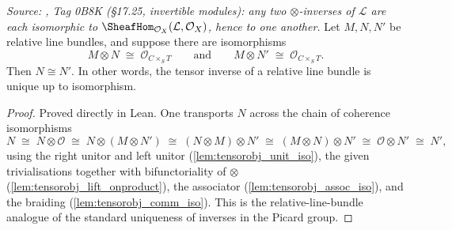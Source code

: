 \begin{lemma}\leanok
  \label{lem:rel_pic_sharp_inverse_unique}
  \textit{Source: \cite{stacks-project}, Tag 0B8K (\S 17.25, invertible modules): any
  two \(\otimes\)-inverses of \(\mathcal{L}\) are each isomorphic to
  \(\SheafHom_{\mathcal{O}_X}(\mathcal{L}, \mathcal{O}_X)\), hence to one
  another.}
  Let \(M, N, N'\) be relative line bundles, and suppose there are
  isomorphisms
  \[
    M \otimes N \;\cong\; \mathcal{O}_{C \times_S T}
    \qquad\text{and}\qquad
    M \otimes N' \;\cong\; \mathcal{O}_{C \times_S T}.
  \]
  Then \(N \cong N'\). In other words, the tensor inverse of a relative line
  bundle is unique up to isomorphism.
\end{lemma}

\begin{proof}
    \leanok
  Proved directly in Lean. One transports \(N\) across the chain of coherence
  isomorphisms
  \[
    N \;\cong\; N \otimes \mathcal{O}
      \;\cong\; N \otimes (M \otimes N')
      \;\cong\; (N \otimes M) \otimes N'
      \;\cong\; (M \otimes N) \otimes N'
      \;\cong\; \mathcal{O} \otimes N'
      \;\cong\; N',
  \]
  using the right unitor and left unitor (\cref{lem:tensorobj_unit_iso}), the
  given trivialisations together with bifunctoriality of \(\otimes\)
  (\cref{lem:tensorobj_lift_onproduct}), the associator
  (\cref{lem:tensorobj_assoc_iso}), and the braiding
  (\cref{lem:tensorobj_comm_iso}). This is the relative-line-bundle analogue of
  the standard uniqueness of inverses in the Picard group.
\end{proof}

